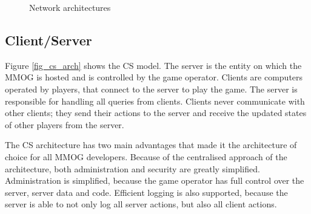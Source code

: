 \documentclass[10pt,a4paper,journal,cspaper,compsoc]{IEEEtran}
\begin{document}
\begin{figure}[htbp]
\centering
\caption{Network architectures}
\end{figure}

\subsection{Client/Server}
\label{client_server_network_model}

Figure \ref{fig_cs_arch} shows the \ac{CS} model. The server is the entity on which the MMOG is hosted and is controlled by the game operator.
Clients are computers operated by players, that connect to the server to play the game. The server is responsible for handling all queries from
clients. Clients never communicate with other clients; they send their actions to the server and receive the updated states of other players from the
server.

The \ac{CS} architecture has two main advantages that made it the architecture of choice for all MMOG developers. Because of the centralised approach
of the architecture, both administration and security are greatly simplified. Administration is simplified, because the game operator has full
control over the server, server data and code. Efficient logging is also supported, because the server is able to not only log all server actions,
but also all client actions.
\end{document}
